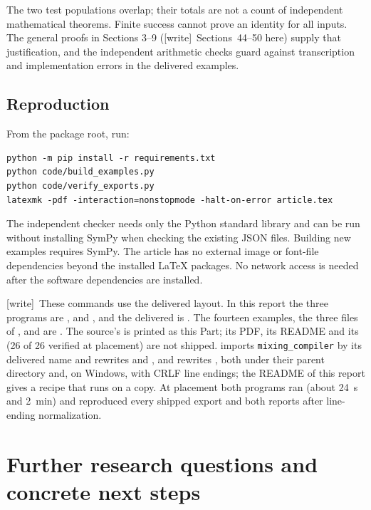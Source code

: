 \documentclass[11pt,letterpaper]{article}
\theoremstyle{definition}
\theoremstyle{remark}
\newcommand{\wtag}{\textup{[write]}}
\begin{document}
The two test populations overlap; their totals are not a count of independent
mathematical theorems. Finite success cannot prove an identity for all inputs.
The general proofs in Sections 3--9 (\wtag\ Sections~44--50 here) supply that justification, and the
independent arithmetic checks guard against transcription and implementation
errors in the delivered examples.

\subsection{Reproduction}

From the package root, run:
\begin{lstlisting}
python -m pip install -r requirements.txt
python code/build_examples.py
python code/verify_exports.py
latexmk -pdf -interaction=nonstopmode -halt-on-error article.tex
\end{lstlisting}
The independent checker needs only the Python standard library and can be run
without installing SymPy when checking the existing JSON files. Building new
examples requires SymPy. The article has no external image or font-file
dependencies beyond the installed LaTeX packages. No network access is needed
after the software dependencies are installed.

\wtag\ These commands use the delivered layout. In this report the three programs are ,  and , and the delivered  is . The fourteen examples, the three files of ,  and  are . The source's  is printed as this Part; its PDF, its README and its  (26 of 26 verified at placement) are not shipped.  imports \texttt{mixing\_compiler} by its delivered name and rewrites  and , and  rewrites , both under their parent directory and, on Windows, with CRLF line endings; the README of this report gives a recipe that runs on a copy. At placement both programs ran (about 24~s and 2~min) and reproduced every shipped export and both reports after line-ending normalization.

\section{Further research questions and concrete next steps}\label{ste:mx:sec:questions}
\end{document}
